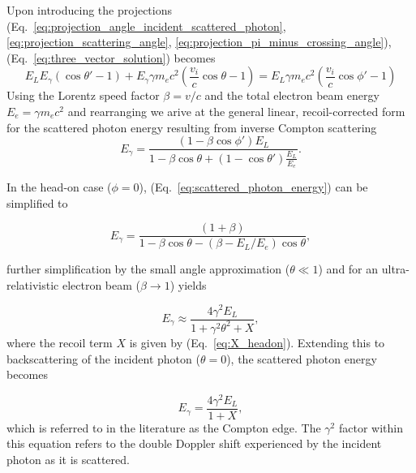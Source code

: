 \documentclass[../main.tex]{subfiles}
\begin{document}
Upon introducing the projections (Eq.~\ref{eq:projection_angle_incident_scattered_photon}, \ref{eq:projection_scattering_angle}, \ref{eq:projection_pi_minus_crossing_angle}), (Eq.~\ref{eq:three_vector_solution}) becomes
\begin{equation}
E_{L}E_{\gamma}\left(\cos\theta'-1\right)+E_{\gamma}\gamma m_{e}c^{2}\left(\frac{v_{i}}{c}\cos\theta-1\right) = E_{L}\gamma m_{e}c^{2}\left( \frac{v_{i}}{c}\cos\phi'-1\right)
\label{eq:three_vector_solution_projections}
\end{equation}
Using the Lorentz speed factor $\beta = v/c$ and the total electron beam energy $E_{e} = \gamma m_{e}c^{2}$ and rearranging we arive at the general linear, recoil-corrected form for the scattered photon energy resulting from inverse Compton scattering 
\begin{equation}
E_{\gamma} = \frac{\left(1-\beta\cos\phi'\right)E_{L}}{1-\beta\cos\theta+\left(1-\cos\theta'\right)\frac{E_{L}}{E_{e}}}. 
\label{eq:scattered_photon_energy}
\end{equation}
  
In the head-on case ($\phi=0$), (Eq.~\ref{eq:scattered_photon_energy}) can be simplified to 

\begin{equation}
E_{\gamma} = \frac{\left(1+\beta\right)}{1-\beta\cos\theta-\left(\beta-E_{L}/E_{e}\right)\cos\theta},
\label{eq:headon_scattered_photon_energy}
\end{equation}

further simplification by the small angle approximation ($\theta \ll 1$) and for an ultra-relativistic electron beam ($\beta \rightarrow 1$) yields

\begin{equation}
E_{\gamma} \approx \frac{4\gamma^{2}E_{L}}{1+\gamma^{2}\theta^{2}+X},    
\label{eq:small_angle_scattered_photon_energy}
\end{equation}
where the recoil term $X$ is given by (Eq.~\ref{eq:X_headon}). Extending this to backscattering of the incident photon ($\theta = 0$), the scattered photon energy becomes

\begin{equation}
E_{\gamma} = \frac{4\gamma^{2}E_{L}}{1+X},
\label{eq:headon_backscattering_scattered_photon_energy}
\end{equation}
which is referred to in the literature \cite{krafft2010compton} as the Compton edge. The $\gamma^{2}$ factor within this equation refers to the double Doppler shift experienced by the incident photon as it is scattered.
\end{document}
